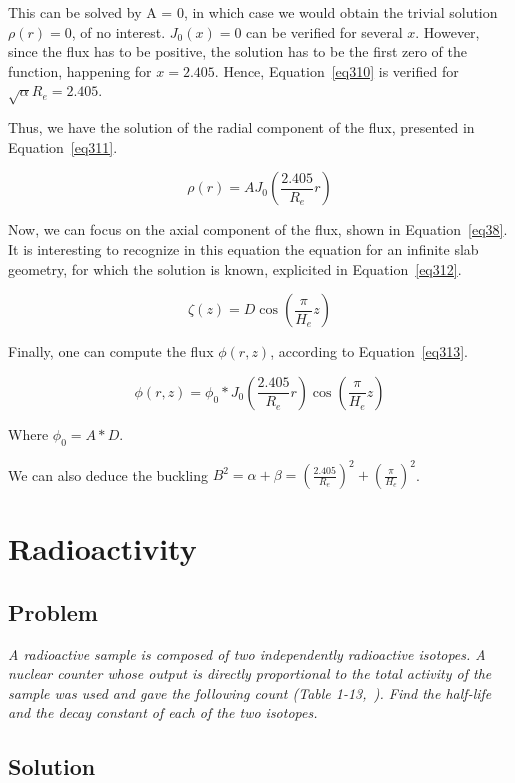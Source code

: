 This can be solved by A = 0, in which case we would obtain the trivial solution $\rho(r) = 0$, of no interest. $J_0(x) = 0$ can be verified for several $x$. However, since the flux has to be positive, the solution has to be the first zero of the function, happening for $x = 2.405$. Hence, Equation~\ref{eq310} is verified for $\sqrt{\alpha}R_e = 2.405$.

Thus, we have the solution of the radial component of the flux, presented in Equation~\ref{eq311}.

\begin{equation}\label{eq311}
\rho(r) = AJ_0(\frac{2.405}{R_e}r)
\end{equation}

Now, we can focus on the axial component of the flux, shown in Equation~\ref{eq38}. It is interesting to recognize in this equation the equation for an infinite slab geometry, for which the solution is known, explicited in Equation~\ref{eq312}.

\begin{equation}\label{eq312}
\zeta(z) = D\cos(\frac{\pi}{H_e}z)
\end{equation}

Finally, one can compute the flux $\phi(r, z)$, according to Equation~\ref{eq313}.

\begin{equation}\label{eq313}
\phi(r, z) = \phi_0 * J_0(\frac{2.405}{R_e}r)\cos(\frac{\pi}{H_e}z)
\end{equation}

Where $\phi_0 = A * D$.

We can also deduce the buckling $B^2 = \alpha + \beta = \left( \frac{2.405}{R_e} \right)^2 + \left( \frac{\pi}{H_e} \right)^2$.

\section{Radioactivity}
\label{prob32}

\subsection{Problem}
\textit{A radioactive sample is composed of two independently radioactive isotopes. A nuclear counter whose output is directly proportional to the total activity of the sample was used and gave the following count (Table 1-13,~\cite{book01}). Find the half-life and the decay constant of each of the two isotopes.}

\subsection{Solution}

